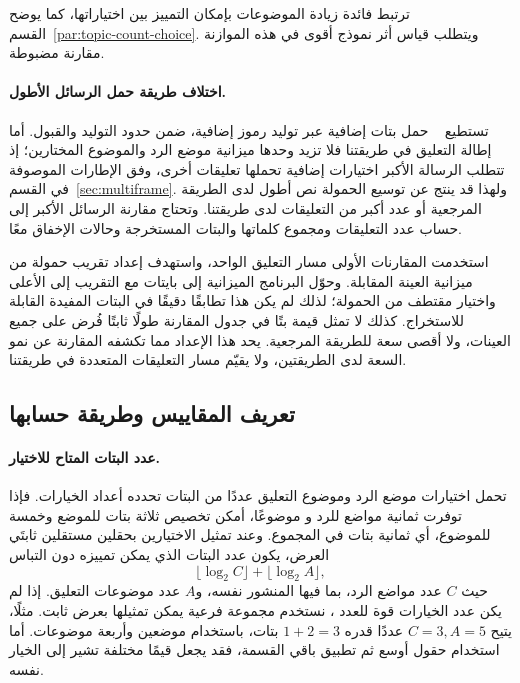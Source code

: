 ترتبط فائدة زيادة الموضوعات بإمكان التمييز بين اختياراتها، كما يوضح القسم~\ref{par:topic-count-choice}. ويتطلب قياس أثر نموذج أقوى في هذه الموازنة مقارنة مضبوطة.

\paragraph{اختلاف طريقة حمل الرسائل الأطول.}
\label{par:baseline-capacity}
تستطيع ~\cite{lin2024zero} حمل بتات إضافية عبر توليد رموز إضافية، ضمن حدود التوليد والقبول. أما إطالة التعليق في طريقتنا فلا تزيد وحدها ميزانية موضع الرد والموضوع المختارين؛ إذ تتطلب الرسالة الأكبر اختيارات إضافية تحملها تعليقات أخرى، وفق الإطارات الموصوفة في القسم~\ref{sec:multiframe}. ولهذا قد ينتج عن توسيع الحمولة نص أطول لدى الطريقة المرجعية أو عدد أكبر من التعليقات لدى طريقتنا. وتحتاج مقارنة الرسائل الأكبر إلى حساب عدد التعليقات ومجموع كلماتها والبتات المستخرجة وحالات الإخفاق معًا.

استخدمت المقارنات الأولى مسار التعليق الواحد، واستهدف إعداد  تقريب حمولة  من ميزانية العينة المقابلة. وحوّل البرنامج الميزانية إلى بايتات مع التقريب إلى الأعلى واختيار مقتطف من الحمولة؛ لذلك لم يكن هذا تطابقًا دقيقًا في البتات المفيدة القابلة للاستخراج. كذلك لا تمثل قيمة  بتًا في جدول المقارنة طولًا ثابتًا فُرض على جميع العينات، ولا أقصى سعة للطريقة المرجعية. يحد هذا الإعداد مما تكشفه المقارنة عن نمو السعة لدى الطريقتين، ولا يقيّم مسار التعليقات المتعددة في طريقتنا.

\subsection{تعريف المقاييس وطريقة حسابها}

\paragraph{عدد البتات المتاح للاختيار.}
تحمل اختيارات موضع الرد وموضوع التعليق عددًا من البتات تحدده أعداد الخيارات.
فإذا توفرت ثمانية مواضع للرد و موضوعًا، أمكن تخصيص ثلاثة بتات للموضع وخمسة للموضوع، أي ثمانية بتات في المجموع.
وعند تمثيل الاختيارين بحقلين مستقلين ثابتَي العرض، يكون عدد البتات الذي يمكن تمييزه دون التباس
\[
\lfloor\log_2 C\rfloor + \lfloor\log_2 A\rfloor,
\]
حيث $C$ عدد مواضع الرد، بما فيها المنشور نفسه، و$A$ عدد موضوعات التعليق.
إذا لم يكن عدد الخيارات قوة للعدد ، نستخدم مجموعة فرعية يمكن تمثيلها بعرض ثابت. مثلًا، يتيح $C=3,A=5$ عددًا قدره $1+2=3$ بتات، باستخدام موضعين وأربعة موضوعات.
أما استخدام حقول أوسع ثم تطبيق باقي القسمة، فقد يجعل قيمًا مختلفة تشير إلى الخيار نفسه.

